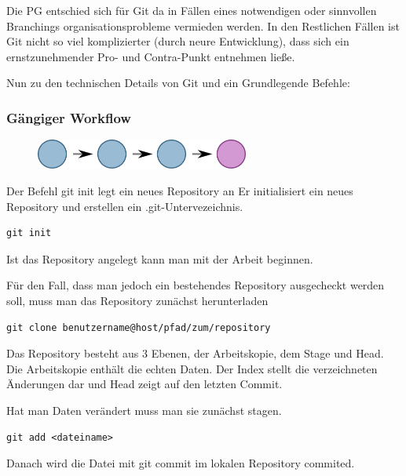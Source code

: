 Die PG entschied sich für Git da in Fällen eines notwendigen oder sinnvollen Branchings organisationsprobleme vermieden werden.
In den Restlichen Fällen ist Git nicht so viel komplizierter (durch neure Entwicklung), dass sich ein ernstzunehmender Pro- und Contra-Punkt entnehmen ließe.

Nun zu den technischen Details von Git und ein Grundlegende Befehle:

\subsubsection{Gängiger Workflow}

\begin{figure}[htb]
\begin{center}
\includegraphics[width=7cm]{bilder/straight.pdf}
\end{center} 
\end{figure}

Der Befehl git init legt ein neues Repository an
Er initialisiert ein neues Repository und erstellen ein .git-Untervezeichnis.

\begin{verbatim}
git init
\end{verbatim}

Ist das Repository angelegt kann man mit der Arbeit beginnen.

Für den Fall, dass man jedoch ein bestehendes Repository ausgecheckt werden soll, muss man das Repository zunächst herunterladen

\begin{verbatim}
git clone benutzername@host/pfad/zum/repository
\end{verbatim}

Das Repository besteht aus 3 Ebenen, der Arbeitskopie, dem Stage und Head.
Die Arbeitskopie enthält die echten Daten. Der Index stellt die verzeichneten Änderungen dar und Head zeigt auf den letzten Commit.

Hat man Daten verändert muss man sie zunächst stagen.

\begin{verbatim}
git add <dateiname>
\end{verbatim}

Danach wird die Datei mit git commit im lokalen Repository commited.

